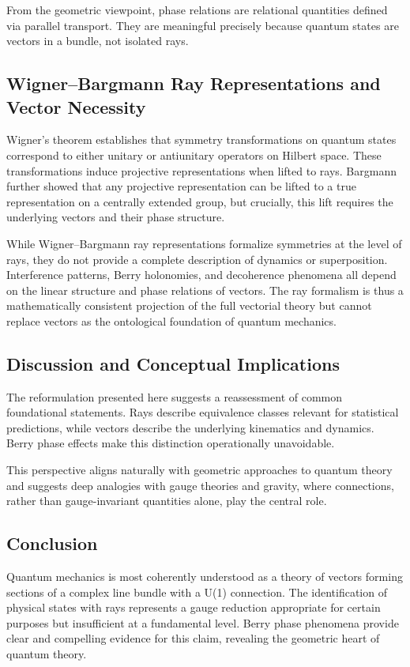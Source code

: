 \documentclass[11pt]{article}
\begin{document}
From the geometric viewpoint, phase relations are relational quantities
defined via parallel transport. They are meaningful precisely because
quantum states are vectors in a bundle, not isolated rays.

\subsection{Wigner–Bargmann Ray Representations and Vector Necessity}

Wigner's theorem establishes that symmetry transformations on quantum
states correspond to either unitary or antiunitary operators on Hilbert
space. These transformations induce projective representations when lifted 
to rays. Bargmann further showed that any projective representation can be
lifted to a true representation on a centrally extended group, but
crucially, this lift requires the underlying vectors and their phase
structure.

While Wigner–Bargmann ray representations formalize symmetries at the 
level of rays, they do not provide a complete description of dynamics 
or superposition. Interference patterns, Berry holonomies, and 
decoherence phenomena all depend on the linear structure and phase
relations of vectors. The ray formalism is thus a mathematically 
consistent projection of the full vectorial theory but cannot 
replace vectors as the ontological foundation of quantum mechanics.

\subsection{Discussion and Conceptual Implications}

The reformulation presented here suggests a reassessment of common 
foundational statements. Rays describe equivalence classes relevant for
statistical predictions, while vectors describe the underlying kinematics
and dynamics. Berry phase effects make this distinction operationally
unavoidable.

This perspective aligns naturally with geometric approaches to quantum
theory and suggests deep analogies with gauge theories and gravity, 
where connections, rather than gauge-invariant quantities alone, 
play the central role.
\subsection{Conclusion}

Quantum mechanics is most coherently understood as a theory of vectors
forming sections of a complex line bundle with a U(1) connection. 
The identification of physical states with rays represents a gauge
reduction appropriate for certain purposes but insufficient at a
fundamental level. Berry phase phenomena provide clear and compelling
evidence for this claim, revealing the geometric heart of quantum theory.
\end{document}
